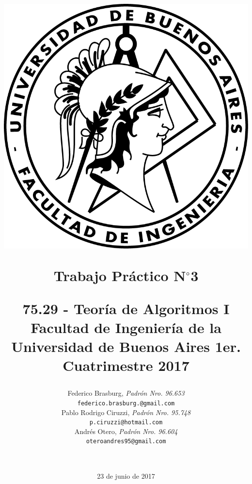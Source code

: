 \documentclass[a4paper,10pt]{article}
\begin{document}
\title{	
	\includegraphics[scale=0.8]{images/logo-fiuba.png} \\
	\begin{center}
		\textbf{Trabajo Práctico N$^{\circ}$3} \linebreak
	\end{center}
	\begin{center}
		\begin{large}
			75.29 - Teoría de Algoritmos I \linebreak
			Facultad de Ingeniería de la Universidad de Buenos Aires \linebreak
			1er. Cuatrimestre 2017 \linebreak
		\end{large}
	\end{center} 
}
\author{	Federico Brasburg, \textit{Padrón Nro. 96.653} \\
			\texttt{ federico.brasburg.@gmail.com } \\ [2.5ex]
			Pablo Rodrigo Ciruzzi, \textit{Padrón Nro. 95.748} \\
			\texttt{ p.ciruzzi@hotmail.com } \\ [2.5ex]
			Andrés Otero, \textit{Padrón Nro. 96.604 } \\
			\texttt{ oteroandres95@gmail.com } \\ [2.5ex] \\
\\
		}
\date{23 de junio de 2017}
\end{document}
